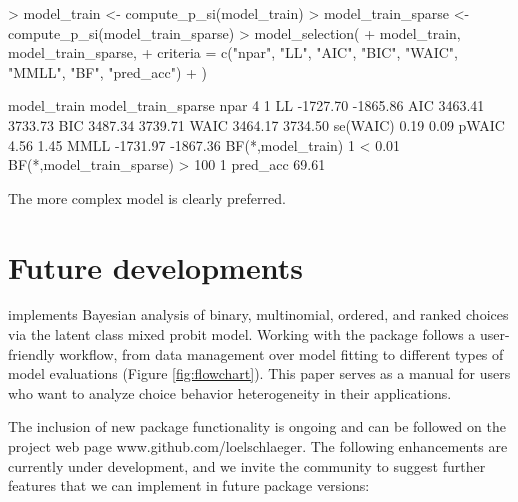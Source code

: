 \documentclass[article,shortnames]{jss}
\begin{document}
\begin{Schunk}
\begin{Sinput}
> model_train <- compute_p_si(model_train)
> model_train_sparse <- compute_p_si(model_train_sparse)
> model_selection(
+    model_train, model_train_sparse,
+    criteria = c("npar", "LL", "AIC", "BIC", "WAIC", "MMLL", "BF", "pred_acc")
+  )
\end{Sinput}
\begin{Soutput}
                         model_train model_train_sparse
npar                               4                  1
LL                          -1727.70           -1865.86
AIC                          3463.41            3733.73
BIC                          3487.34            3739.71
WAIC                         3464.17            3734.50
se(WAIC)                        0.19               0.09
pWAIC                           4.56               1.45
MMLL                        -1731.97           -1867.36
BF(*,model_train)                  1             < 0.01
BF(*,model_train_sparse)       > 100                  1
pred_acc                      69.61%
\end{Soutput}
\end{Schunk}

The more complex model is clearly preferred.

\section{Future developments} \label{sec:conclusion}

 implements Bayesian analysis of binary, multinomial, ordered, and ranked choices via the latent class mixed probit model. Working with the package follows a user-friendly workflow, from data management over model fitting to different types of model evaluations (Figure \ref{fig:flowchart}). This paper serves as a manual for  users who want to analyze choice behavior heterogeneity in their applications.

The inclusion of new package functionality is ongoing and can be followed on the project web page www.github.com/loelschlaeger. The following enhancements are currently under development, and we invite the community to suggest further features that we can implement in future package versions:
\end{document}
